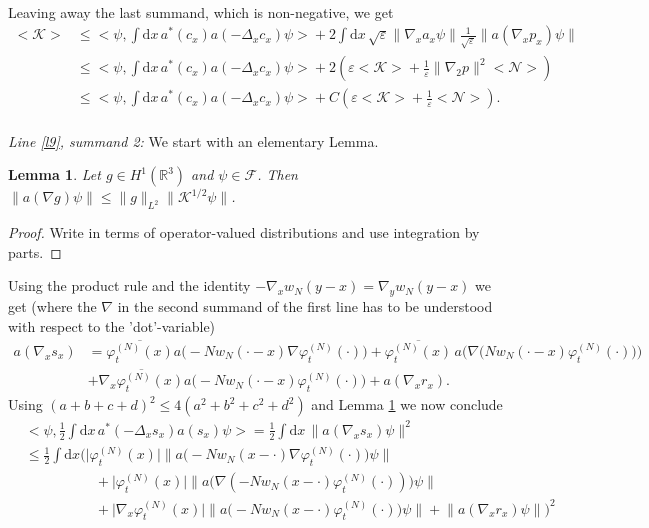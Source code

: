 \documentclass[11pt,a4paper,DIV11]{scrartcl}	%
\newtheorem{lem}[thm]{Lemma}
\newcommand{\fock}{\mathcal{F}}		%
\newcommand{\di}{\textrm{d}}		%
\newcommand{\Ncal}{\mathcal{N}}		%
\newcommand{\Kcal}{\mathcal{K}}		%
\newcommand{\estlist}[2]{\emph{\vspace{.3em}\\Line \ref{l#1}, summand #2:}}
\newcommand{\scal}[2]{\big<#1,#2\big>} %
\newcommand{\cc}[1]{\overline{#1}}	%
\newcommand{\Rbb}{\mathbb{R}}		%
\newcommand{\norm}[1]{\lVert#1\rVert}	%
\newcommand{\ev}[1]{\big<#1\big>}	%
\newcommand{\ph}{\varphi_t^{(N)}}	%
\newcommand{\gradone}{\nabla_2}
\begin{document}
\begin{fleqn}[0.5em]
\begin{align*}
\end{align*}
Leaving away the last summand, which is non-negative, we get
\begin{equation}
\label{eq:bound1A}
\begin{split}
 \ev{\Kcal} & \leq \scal{\psi}{\int \di x\, a^\ast(c_x) a(-\Delta_x c_x)\psi} + 2\int \di x\, \sqrt{\varepsilon} \norm{\nabla_x a_x \psi} \frac{1}{\sqrt{\varepsilon}} \norm{a(\nabla_x p_x)\psi} \\
& \leq \scal{\psi}{\int \di x\, a^\ast(c_x) a(-\Delta_x c_x)\psi} + 2\left( \varepsilon \ev{\Kcal} + \frac{1}{\varepsilon}  \norm{\gradone p}^2 \ev{\Ncal}\right) \\
& \leq \scal{\psi}{\int \di x\,a^\ast(c_x) a(-\Delta_x c_x)\psi} + C\left( \varepsilon \ev{\Kcal} + \frac{1}{\varepsilon}\ev{\Ncal} \right).
\end{split}
\end{equation}
\estlist{9}{2}
We start with an elementary Lemma.
\begin{lem} \label{l:agradnorm}
 Let $g \in H^1(\Rbb^3)$ and $\psi \in \fock$. Then $\norm{a(\nabla g)\psi}  \leq \norm{g}_{L^2} \norm{\Kcal^{1/2}\psi}$.
\end{lem}
\begin{proof}
Write in terms of operator-valued distributions and use integration by parts. 
\end{proof}
Using the product rule and the identity $-\nabla_x w_N(y-x) = \nabla_y w_N(y-x)$ we get (where the $\nabla$ in the second summand of the first line has to be understood with respect to the 'dot'-variable)
\begin{align*}
 a(\nabla_x s_x) & = \cc{\ph(x)} a\big(-Nw_N(\cdot-x)\nabla\ph(\cdot)\big) + \cc{\ph(x)}\,a\Big(\nabla\big(N w_N(\cdot-x)\ph(\cdot)\big)\Big) \\
 & + \cc{\nabla_x \ph(x)} a\big(-Nw_N(\cdot-x)\ph(\cdot)\big) + a(\nabla_x r_x).
\end{align*}
Using $(a+b+c+d)^2 \leq 4(a^2+b^2+c^2+d^2)$ and Lemma \ref{l:agradnorm} we now conclude
\begin{align*}
 & \scal{\psi}{\frac{1}{2}\int \di x\, a^\ast(-\Delta_x s_x) a(s_x)\psi} = \frac{1}{2}\int \di x\, \norm{a(\nabla_x s_x)\psi}^2 \\
& \leq \frac{1}{2} \int \di x \Big( \lvert \ph(x)\rvert \norm{a\big(-Nw_N(x-\cdot)\nabla\ph(\cdot)\big)\psi} \\
& \qquad\qquad\quad + \lvert \ph(x)\rvert \norm{a\big(\nabla(-N w_N(x-\cdot)\ph(\cdot))\big)\psi} \\
& \qquad\qquad\quad + \lvert \nabla_x \ph(x)\rvert \norm{a\big(-Nw_N(x-\cdot)\ph(\cdot)\big)\psi} + \norm{a(\nabla_x r_x)\psi}  \Big)^2 \\

\end{align*}
\end{fleqn}
\end{document}
